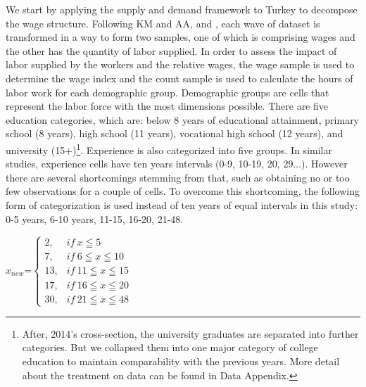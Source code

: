 \begin{onehalfspace}
We start by applying the supply and demand framework to Turkey to
decompose the wage structure. Following KM and AA, and \citet{2015Bakis},
each wave of dataset is transformed in a way to form two samples,
one of which is comprising wages and the other has the quantity of
labor supplied. In order to assess the impact of labor supplied by
the workers and the relative wages, the wage sample is used to determine
the wage index and the count sample is used to calculate the hours
of labor work for each demographic group. Demographic groups are cells
that represent the labor force with the most dimensions possible.
There are five education categories, which are: below 8 years of educational
attainment, primary school (8 years), high school (11 years), vocational
high school (12 years), and university (15+)\footnote{After, 2014's cross-section, the university graduates are separated
into further categories. But we collapsed them into one major category
of college education to maintain comparability with the previous years.
More detail about the treatment on data can be found in Data Appendix.}. Experience is also categorized into five groups. In similar studies,
experience cells have ten years intervals (0-9, 10-19, 20, 29...).
However there are several shortcomings stemming from that, such as
obtaining no or too few observations for a couple of cells. To overcome
this shortcoming, the following form of categorization is used instead
of ten years of equal intervals in this study: 0-5 years, 6-10 years,
11-15, 16-20, 21-48.
\end{onehalfspace}
\begin{onehalfspace}
\begin{center}
$x_{new}$=$\begin{cases}
2, & if\ x\leqq5\\
7, & if\ 6\leqq x\leqq10\\
13, & if\ 11\leqq x\leqq15\\
17, & if\ 16\leqq x\leqq20\\
30, & if\ 21\leqq x\leqq48
\end{cases}$
\par\end{center}
\end{onehalfspace}

